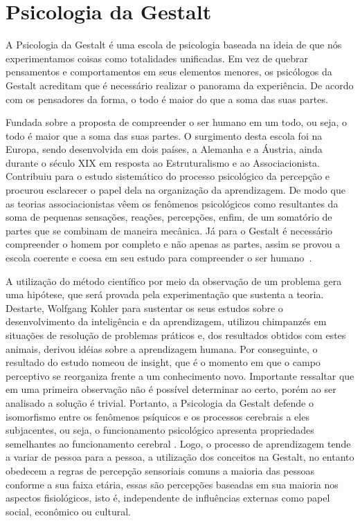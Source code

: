 \section{Psicologia da Gestalt}\label{gestalt}

A Psicologia da Gestalt é uma escola de psicologia baseada na ideia de que nós experimentamos coisas como totalidades unificadas. 
Em vez de quebrar pensamentos e comportamentos em seus elementos menores, os psicólogos da Gestalt acreditam que é necessário realizar o panorama da experiência. 
De acordo com os pensadores da forma, o todo é maior do que a soma das suas partes.

Fundada sobre a proposta de compreender o ser humano em um todo, ou seja, o todo é maior que a soma das suas partes.
O surgimento desta escola foi na Europa, sendo desenvolvida em dois países, a Alemanha e a Áustria, ainda durante o século XIX em resposta ao Estruturalismo e ao Associacionista.
Contribuiu para o estudo sistemático do processo psicológico da percepção e procurou esclarecer o papel dela na organização da aprendizagem.
De modo que as teorias associacionistas vêem os fenômenos psicológicos como resultantes da soma de pequenas sensações, reações, percepções, enfim, de um somatório de partes que se combinam de maneira mecânica.
Já para o Gestalt é necessário compreender o homem por completo e não apenas as partes, assim se provou a escola coerente e coesa em seu estudo para compreender o ser humano~\cite{silva2007psicologia_educacao}.

A utilização do método científico por meio da observação de um problema gera uma hipótese, que será provada pela experimentação que sustenta a teoria. 
Destarte, Wolfgang Kohler para sustentar os seus estudos sobre o desenvolvimento da inteligência e da
aprendizagem, utilizou chimpanzés em situações de resolução de problemas práticos e, dos resultados obtidos com estes animais, derivou idéias sobre a aprendizagem humana. 
Por conseguinte, o resultado do estudo nomeou de insight, que é o momento em que o campo perceptivo se reorganiza frente a um conhecimento novo. 
Importante ressaltar que em uma primeira observação não é possível determinar ao certo, porém ao ser analisado a solução é trivial.
Portanto, a Psicologia da Gestalt defende o isomorfismo entre os fenômenos psíquicos e os
processos cerebrais a eles subjacentes, ou seja, o funcionamento psicológico apresenta propriedades semelhantes ao funcionamento cerebral \cite{silva2007psicologia_educacao}. 
Logo, o processo de aprendizagem tende a variar de pessoa para a pessoa, a utilização dos
conceitos na Gestalt, no entanto obedecem a regras de percepção sensoriais comuns a maioria das pessoas conforme a sua faixa etária, essas são percepções baseadas em sua maioria nos aspectos fisiológicos, isto é, independente de influências externas como papel social, econômico ou cultural.
